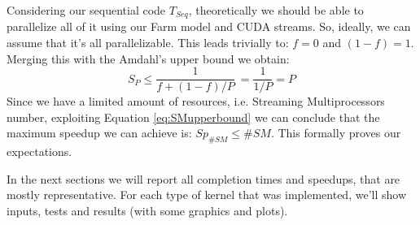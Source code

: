 Considering our sequential code \(T_{Seq}\), theoretically we should be able to parallelize all of it using our Farm model and CUDA streams. So, ideally, we can assume that it's all parallelizable. This leads trivially to: \(f=0\) and  \((1-f)=1\).\\
Merging this with the Amdahl's upper bound we obtain:
\begin{equation}\label{eq:SMupperbound}
		S_{P} \leq \frac{1}{f+(1-f)/P}\   = \frac{1}{1/P}=P
\end{equation}
Since we have a limited amount of resources, i.e. Streaming Multiprocessors number, exploiting Equation \ref{eq:SMupperbound} we can conclude that the maximum speedup we can achieve is: \(Sp_{\#SM} \leq \#SM\). This formally proves our expectations.


In the next sections we will report all completion times and speedups, that are mostly representative. 
For each type of kernel that was implemented,  we'll show inputs, tests and results (with some graphics and plots).



